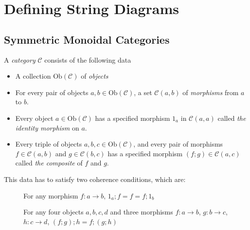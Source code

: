 \section{Defining String Diagrams}

\subsection{Symmetric Monoidal Categories}

\begin{defn}[Category]
A \emph{category} $\mathcal{C}$ consists of the following data
\begin{itemize}
\item{A collection $\text{Ob}(\mathcal{C})$ of \emph{objects}}
\item{For every pair of objects $a,b \in \text{Ob}(\mathcal{C})$, a set $\mathcal{C}(a,b)$ of \emph{morphisms} from $a$ to $b$.}
\item{Every object $a \in \text{Ob}(\mathcal{C})$ has a specified morphism $1_a$ in $\mathcal{C}(a,a)$ called \emph{the identity morphism} on $a$.}
\item{Every triple of objects $a,b,c \in \text{Ob}(\mathcal{C})$, and every pair of morphisms $f \in \mathcal{C}(a,b)$ and $g \in \mathcal{C}(b,c)$ has a specified morphism $(f;g) \in \mathcal{C}(a,c)$ called \emph{the composite} of $f$ and $g$.}
\end{itemize}
This data has to satisfy two coherence conditions, which are:
\begin{description}
\item[]{For any morphism $f: a \rightarrow b$, $1_a;f = f = f;1_b$}
\item[]{For any four objects $a,b,c,d$ and three morphisms $f: a \rightarrow b$, $g: b \rightarrow c$, $h: c \rightarrow d$, $(f;g);h = f;(g;h)$}
\end{description}
\end{defn}

\begin{defn}

\end{defn}

\begin{example}

\end{example}

\begin{defn}[Functor]

\end{defn}

